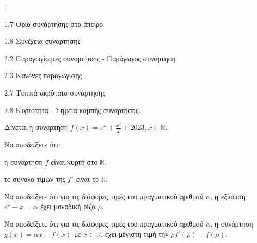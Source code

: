 \begin{ylh}{1}
    \item 1.7 Όρια συνάρτησης στο άπειρο
    \item 1.8 Συνέχεια συνάρτησης
    \item 2.2 Παραγωγίσιμες συναρτήσεις - Παράγωγος συνάρτηση
    \item 2.3 Κανόνες παραγώγισης
    \item 2.7 Τοπικά ακρότατα συνάρτησης
    \item 2.8 Κυρτότητα - Σημεία καμπής συνάρτησης.
\end{ylh}
Δίνεται η συνάρτηση $f(x)=e^x+\frac{x^2}{2}+2023,x \in \mathbb{R}$.
\begin{alist}
\item Να αποδείξετε ότι:
    \begin{rlist}
    \item η συνάρτηση $f$ είναι κυρτή στο $\mathbb{R}$. 
    \item το σύνολο τιμών της $f'$ είναι το $\mathbb{R}$. 
    \end{rlist}
\item Να αποδείξετε ότι για τις διάφορες τιμές του πραγματικού αριθμού $α$, η εξίσωση $e^x+x=α$ έχει μοναδική ρίζα $ρ$. 
\item Να αποδείξετε ότι για τις διάφορες τιμές του πραγματικού αριθμού $α$, η συνάρτηση $g(x)=αx-f(x)$ με $x \in \mathbb{R}$, έχει μέγιστη τιμή την $ρf'(\rho)-f(\rho)$. 
\end{alist}
